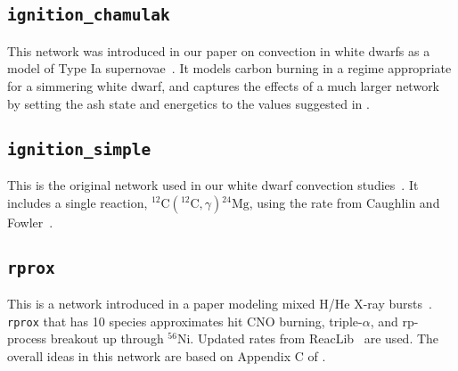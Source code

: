 \subsection{{\tt ignition\_chamulak}}

This network was introduced in our paper on convection in white dwarfs
as a model of Type Ia supernovae~\cite{wdconvect}.  It models 
carbon burning in a regime appropriate for a simmering white dwarf,
and captures the effects of a much larger network by setting the ash
state and energetics to the values suggested in \cite{chamulak:2008}.

\subsection{{\tt ignition\_simple}}

This is the original network used in our white dwarf convection
studies~\cite{lowMach4}.  It includes a single reaction,
$^{12}\mathrm{C}({}^{12}\mathrm{C},\gamma){}^{24}\mathrm{Mg}$, using
the rate from Caughlin and Fowler~\cite{caughlan-fowler:1988}.

\subsection{{\tt rprox}}

This is a network introduced in a paper modeling mixed H/He X-ray
bursts~\cite{xrb2}.  {\tt rprox} that has 10 species approximates hit
CNO burning, triple-$\alpha$, and rp-process breakout up through
$^{56}\mathrm{Ni}$.  Updated rates from ReacLib~\cite{ReacLib} are
used.  The overall ideas in this network are based on Appendix C of
\cite{wallacewoosley:1981}.
